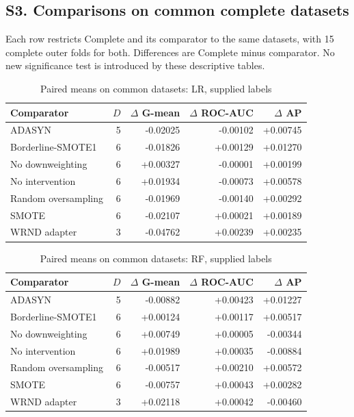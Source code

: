 \subsection*{S3. Comparisons on common complete datasets}
Each row restricts Complete and its comparator to the same datasets, with 15 complete outer folds for both. Differences are Complete minus comparator. No new significance test is introduced by these descriptive tables.
\begin{table}[htbp]
\caption{Paired means on common datasets: LR, supplied labels}
\centering\small
\begin{tabular}{lrrrr}
\hline
Comparator & $D$ & $\Delta$ G-mean & $\Delta$ ROC-AUC & $\Delta$ AP\\
\hline
ADASYN & 5 & -0.02025 & -0.00102 & +0.00745 \\
Borderline-SMOTE1 & 6 & -0.01826 & +0.00129 & +0.01270 \\
No downweighting & 6 & +0.00327 & -0.00001 & +0.00199 \\
No intervention & 6 & +0.01934 & -0.00073 & +0.00578 \\
Random oversampling & 6 & -0.01969 & -0.00140 & +0.00292 \\
SMOTE & 6 & -0.02107 & +0.00021 & +0.00189 \\
WRND adapter & 3 & -0.04762 & +0.00239 & +0.00235 \\
\hline
\end{tabular}
\end{table}
\begin{table}[htbp]
\caption{Paired means on common datasets: RF, supplied labels}
\centering\small
\begin{tabular}{lrrrr}
\hline
Comparator & $D$ & $\Delta$ G-mean & $\Delta$ ROC-AUC & $\Delta$ AP\\
\hline
ADASYN & 5 & -0.00882 & +0.00423 & +0.01227 \\
Borderline-SMOTE1 & 6 & +0.00124 & +0.00117 & +0.00517 \\
No downweighting & 6 & +0.00749 & +0.00005 & -0.00344 \\
No intervention & 6 & +0.01989 & +0.00035 & -0.00884 \\
Random oversampling & 6 & -0.00517 & +0.00210 & +0.00572 \\
SMOTE & 6 & -0.00757 & +0.00043 & +0.00282 \\
WRND adapter & 3 & +0.02118 & +0.00042 & -0.00460 \\
\hline
\end{tabular}
\end{table}
